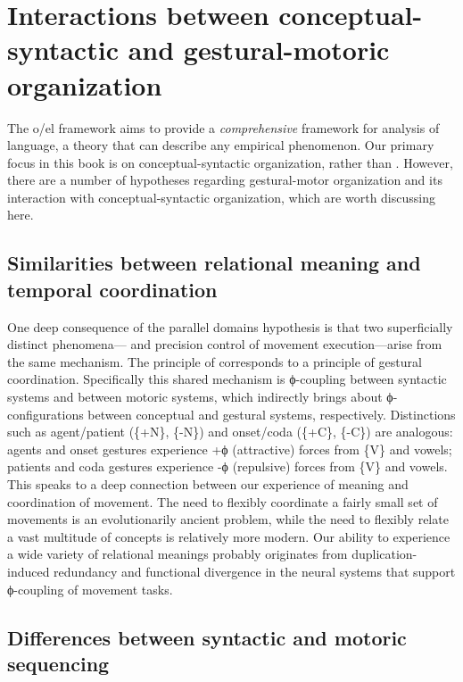 \section{Interactions between conceptual-syntactic and gestural-motoric organization}

The o/el framework aims to provide a \textit{comprehensive} framework for analysis of language, a theory that can describe any empirical phenomenon. Our primary focus in this book is on conceptual-syntactic organization, rather than . However, there are a number of hypotheses regarding gestural-motor organization and its interaction with conceptual-syntactic organization, which are worth discussing here.

\subsection{Similarities between relational meaning and temporal coordination}

One deep consequence of the parallel domains hypothesis is that two superficially distinct phenomena— and precision control of movement execution—arise from the same mechanism. The principle of  corresponds to a principle of gestural coordination. Specifically this shared mechanism is ϕ-coupling between syntactic systems and between motoric systems, which indirectly brings about ϕ-configurations between conceptual and gestural systems, respectively. Distinctions such as agent/patient (\{+N\}, \{-N\}) and onset/coda (\{+C\}, \{-C\}) are analogous: agents and onset gestures experience +ϕ (attractive) forces from \{V\} and vowels; patients and coda gestures experience -ϕ (repulsive) forces from \{V\} and vowels. This speaks to a deep connection between our experience of meaning and coordination of movement. The need to flexibly coordinate a fairly small set of movements is an evolutionarily ancient problem, while the need to flexibly relate a vast multitude of concepts is relatively more modern. Our ability to experience a wide variety of relational meanings probably originates from duplication-induced redundancy and functional divergence in the neural systems that support ϕ-coupling of movement tasks. 

\subsection{Differences between syntactic and motoric sequencing} 

